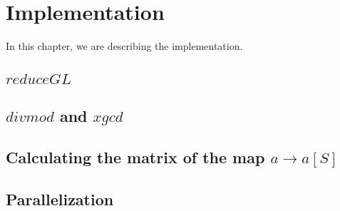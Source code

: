
\section{Implementation}

In this chapter, we are describing the implementation.

\subsection{$reduceGL$}
\label{impl:reduceGL}

\subsection{$divmod$ and $xgcd$}

\subsection{Calculating the matrix of the map $a \rightarrow a[S]$}
\label{impl:calcMatrix}

\subsection{Parallelization}
